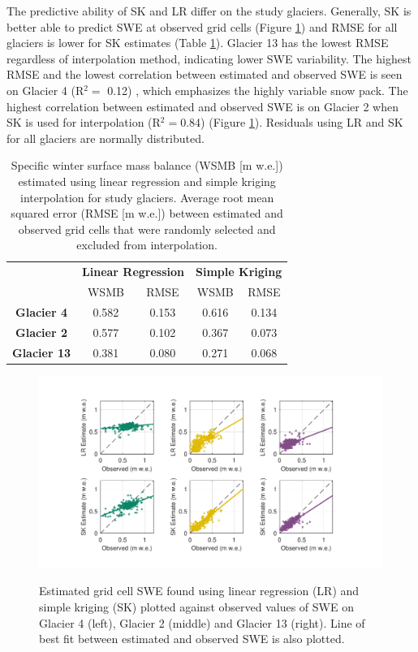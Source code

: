 \documentclass[twocolumn,letterpaper]{igs}
\begin{document}
The predictive ability of SK and LR differ on the study glaciers. Generally, SK is better able to predict SWE at observed grid cells (Figure \ref{fig:observedVSestimated_S2}) and RMSE for all glaciers is lower for SK estimates (Table \ref{tab:WSMB&RMSE}). Glacier 13 has the lowest RMSE regardless of interpolation method, indicating lower SWE variability. The highest RMSE and the lowest correlation between estimated and observed SWE is seen on Glacier 4 (R$^2=$ 0.12) , which emphasizes the highly variable snow pack.  The highest correlation between estimated and observed SWE is on Glacier 2 when SK is used for interpolation (R$^2=$0.84) (Figure \ref{fig:observedVSestimated_S2}). Residuals using LR and SK for all glaciers are normally distributed.

\begin{table}[]
\centering
\caption{Specific winter surface mass balance (WSMB [m w.e.]) estimated using linear regression and simple kriging interpolation for study glaciers. Average root mean squared error (RMSE [m w.e.]) between estimated and observed grid cells that were randomly selected and excluded from interpolation.}
\label{tab:WSMB&RMSE}
\begin{tabular}{ccccc}
 & \multicolumn{2}{c}{\textbf{Linear Regression}} & \multicolumn{2}{c}{\textbf{Simple Kriging}} \\
 & WSMB & RMSE & WSMB & RMSE \\
  \midrule
\textbf{Glacier 4} & 0.582 & 0.153 & 0.616 & 0.134 \\
 \midrule
\textbf{Glacier 2} & 0.577 & 0.102 & 0.367 & 0.073 \\
 \midrule
\textbf{Glacier 13} & 0.381 & 0.080 & 0.271 & 0.068
\end{tabular}
\end{table}

\begin{figure}
	\centering
	\includegraphics[width =\textwidth]{observedVSestimated_S2.pdf}\\
	\caption{Estimated grid cell SWE found using linear regression (LR) and simple kriging (SK) plotted against observed values of SWE on Glacier 4 (left), Glacier 2 (middle) and Glacier 13 (right). Line of best fit between estimated and observed SWE is also plotted.}
	\label{fig:observedVSestimated_S2}
\end{figure}
\end{document}
